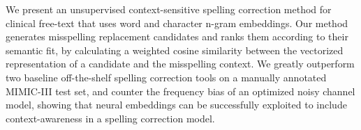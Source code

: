 We present an unsupervised context-sensitive spelling correction method for clinical free-text that uses word and character n-gram embeddings. Our method generates misspelling replacement candidates and ranks them according to their semantic fit, by calculating a weighted cosine similarity between the vectorized representation of a candidate and the misspelling context. We greatly outperform two baseline off-the-shelf spelling correction tools on a manually annotated MIMIC-III test set, and counter the frequency bias of an optimized noisy channel model, showing that neural embeddings can be successfully exploited to include context-awareness in a spelling correction model.
